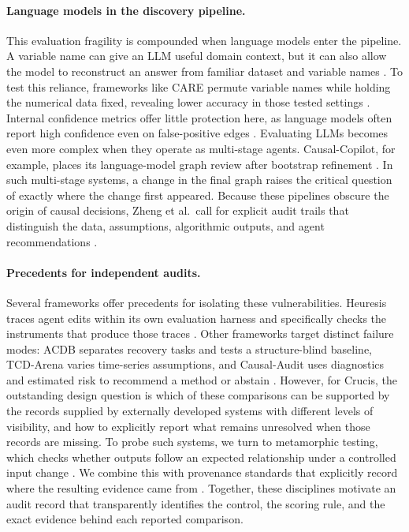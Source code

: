 \documentclass[12pt,letterpaper]{article}
\newcommand{\ours}{}
\begin{document}
\paragraph{Language models in the discovery pipeline.} This evaluation fragility is compounded when language models enter the pipeline. A variable name can give an LLM useful domain context, but it can also allow the model to reconstruct an answer from familiar dataset and variable names \citep{kiciman2023causal,srivastava2025llm}. To test this reliance, frameworks like CARE permute variable names while holding the numerical data fixed, revealing lower accuracy in those tested settings \citep{dong2025care}. Internal confidence metrics offer little protection here, as language models often report high confidence even on false-positive edges \citep{kumar2026plausibility}. Evaluating LLMs becomes even more complex when they operate as multi-stage agents. Causal-Copilot, for example, places its language-model graph review after bootstrap refinement \citep{wang2025causalcopilot}. In such multi-stage systems, a change in the final graph raises the critical question of exactly where the change first appeared\ours. Because these pipelines obscure the origin of causal decisions, Zheng et al.\ call for explicit audit trails that distinguish the data, assumptions, algorithmic outputs, and agent recommendations \citep{zheng2026causal}.

\paragraph{Precedents for independent audits.} Several frameworks offer precedents for isolating these vulnerabilities. Heuresis traces agent edits within its own evaluation harness and specifically checks the instruments that produce those traces \citep{ma2026heuresis}. Other frameworks target distinct failure modes: ACDB separates recovery tasks and tests a structure-blind baseline, TCD-Arena varies time-series assumptions, and Causal-Audit uses diagnostics and estimated risk to recommend a method or abstain \citep{deb2026acdb,stein2026tcdarena,ruiz2026causalaudit}. However, for Crucis, the outstanding design question is which of these comparisons can be supported by the records supplied by externally developed systems with different levels of visibility, and how to explicitly report what remains unresolved when those records are missing\ours. To probe such systems, we turn to metamorphic testing, which checks whether outputs follow an expected relationship under a controlled input change \citep{chen1998metamorphic,segura2016survey,ribeiro2020beyond}. We combine this with provenance standards that explicitly record where the resulting evidence came from \citep{moreau2013prov}. Together, these disciplines motivate an audit record that transparently identifies the control, the scoring rule, and the exact evidence behind each reported comparison\ours.
\end{document}
